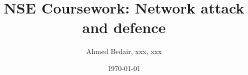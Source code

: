 \documentclass[12pt]{informatics-report}
\title{NSE Coursework: Network attack and defence}
\author{Ahmed Bedair, xxx, xxx}
\date{\today}
\begin{document}
\createFrontMatter%
\onehalfspacing%
\tableofcontents
\doublespacing%






\end{document}

